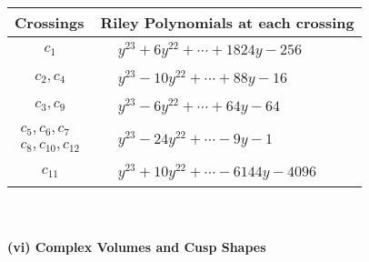 \documentclass[1p]{elsarticle_modified}
\theoremstyle{definition}
\begin{document}
\begin{tabular}{m{50pt}|m{274pt}}
Crossings & \hspace{64pt}Riley Polynomials at each crossing \\
\hline $$\begin{aligned}c_{1}\end{aligned}$$&$\begin{aligned}
&y^{23}+6 y^{22}+\cdots+1824 y-256
\end{aligned}$\\
\hline $$\begin{aligned}c_{2},c_{4}\end{aligned}$$&$\begin{aligned}
&y^{23}-10 y^{22}+\cdots+88 y-16
\end{aligned}$\\
\hline $$\begin{aligned}c_{3},c_{9}\end{aligned}$$&$\begin{aligned}
&y^{23}-6 y^{22}+\cdots+64 y-64
\end{aligned}$\\
\hline $$\begin{aligned}c_{5},c_{6},c_{7}\\c_{8},c_{10},c_{12}\end{aligned}$$&$\begin{aligned}
&y^{23}-24 y^{22}+\cdots-9 y-1
\end{aligned}$\\
\hline $$\begin{aligned}c_{11}\end{aligned}$$&$\begin{aligned}
&y^{23}+10 y^{22}+\cdots-6144 y-4096
\end{aligned}$\\
\hline
\end{tabular}\\~\\
\newpage\flushleft \textbf{(vi) Complex Volumes and Cusp Shapes}
\end{document}
